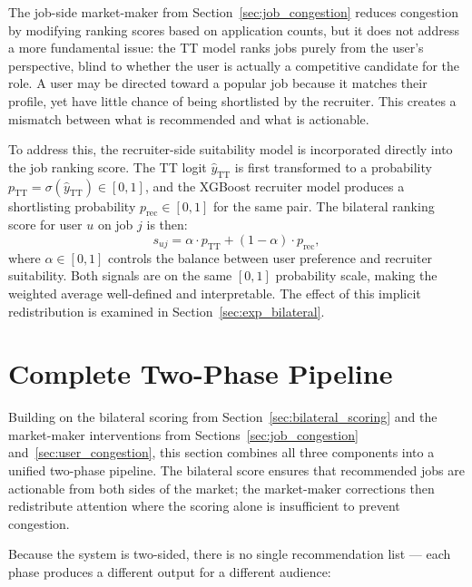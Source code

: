 The job-side market-maker from Section~\ref{sec:job_congestion} reduces 
congestion by modifying ranking scores based on application counts, but 
it does not address a more fundamental issue: the \gls{TT} model ranks 
jobs purely from the user's perspective, blind to whether the user is 
actually a competitive candidate for the role. A user may be directed 
toward a popular job because it matches their profile, yet have little 
chance of being shortlisted by the recruiter. This creates a mismatch 
between what is recommended and what is actionable.

To address this, the recruiter-side suitability model is incorporated 
directly into the job ranking score. The \gls{TT} logit 
$\hat{y}_{\text{TT}}$ is first transformed to a probability 
$p_{\text{TT}} = \sigma(\hat{y}_{\text{TT}}) \in [0,1]$, and the 
XGBoost recruiter model produces a shortlisting probability 
$p_{\text{rec}} \in [0,1]$ for the same pair. The bilateral ranking 
score for user $u$ on job $j$ is then:
\begin{equation}
    s_{uj} = \alpha \cdot p_{\text{TT}} + (1 - \alpha) \cdot p_{\text{rec}},
    \label{eq:bilateral_score}
\end{equation}
where $\alpha \in [0,1]$ controls the balance between user preference 
and recruiter suitability. Both signals are on the same $[0,1]$ 
probability scale, making the weighted average well-defined and 
interpretable. The effect of this 
implicit redistribution is examined in 
Section~\ref{sec:exp_bilateral}.

\section{Complete Two-Phase Pipeline}
\label{sec:hybrid_strategy}

Building on the bilateral scoring from
Section~\ref{sec:bilateral_scoring} and the market-maker interventions
from Sections~\ref{sec:job_congestion} and~\ref{sec:user_congestion},
this section combines all three components into a unified two-phase
pipeline. The bilateral score ensures that recommended jobs are
actionable from both sides of the market; the market-maker corrections
then redistribute attention where the scoring alone is insufficient to
prevent congestion.

Because the system is two-sided, there is no single recommendation
list --- each phase produces a different output for a different audience:

